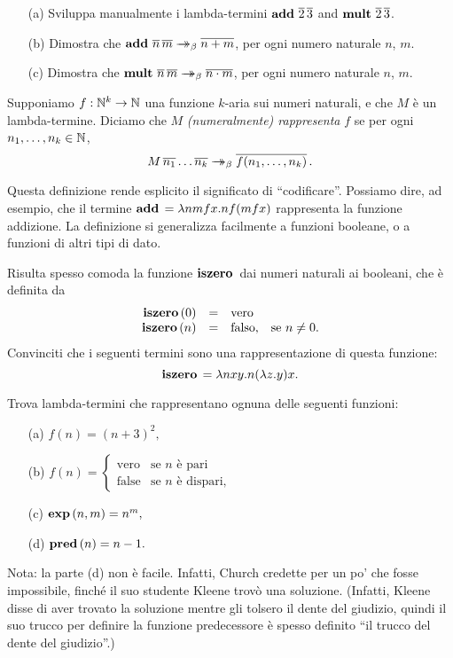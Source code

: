 \documentclass{article}
\begin{document}
\begin{exercise}
  \begin{enumerate}
  \item[(a)] Sviluppa manualmente i lambda-termini
    $\mathop{\textbf{\bf add}\,}\mathop{\overline{2}}\mathop{\overline{3}}$ and $\mathop{\textbf{\bf mult}\,}\mathop{\overline{2}}\mathop{\overline{3}}$.
  \item[(b)] Dimostra che $\mathop{\textbf{\bf add}\,}\mathop{\overline{n}}\mathop{\overline{m}}\mathrel{\rightarrow\!\!\!\!\!\rightarrow}_{\beta}\mathop{\overline{n+m}}$,
    per ogni numero naturale $n$, $m$.
  \item[(c)] Dimostra che
    $\mathop{\textbf{\bf mult}\,}\mathop{\overline{n}}\mathop{\overline{m}}\mathrel{\rightarrow\!\!\!\!\!\rightarrow}_{\beta}\mathop{\overline{n\cdot m}}$, per ogni numero
    naturale $n$, $m$.
  \end{enumerate}
\end{exercise}

\begin{definition}
  Supponiamo $f:\mathbb{N}^k\to \mathbb{N}$ una funzione $k$-aria sui numeri naturali,
  e che $M$ \`e un lambda-termine. Diciamo che $M$ {\em (numeralmente)
    rappresenta} $f$ se per ogni $n_1,\ldots,n_k\in\mathbb{N}$,
  \[ M\mathop{\overline{n_1}}\ldots\mathop{\overline{n_k}} \mathrel{\rightarrow\!\!\!\!\!\rightarrow}_{\beta} \mathop{\overline{f(n_1,\ldots,n_k)}}.
  \]
\end{definition}

Questa definizione rende esplicito il significato di ``codificare''.
Possiamo dire, ad esempio, che il termine $\mathop{\textbf{\bf add}\,} = \lambda nmfx.nf(mfx)$
rappresenta la funzione addizione. La definizione si generalizza facilmente
a funzioni booleane, o a funzioni di altri tipi di dato.

Risulta spesso comoda la funzione $\mathop{\textbf{\bf iszero}\,}$ dai numeri naturali ai booleani,
che \`e definita da
\[ \begin{array}{rcll}
  \mathop{\textbf{\bf iszero}\,}(0) &=& \mbox{vero} \\
  \mathop{\textbf{\bf iszero}\,}(n) &=& \mbox{falso,} & \mbox{se $n\neq 0$.}
\end{array}
\]
Convinciti che i seguenti termini sono una rappresentazione
di questa funzione:
\[ \mathop{\textbf{\bf iszero}\,} = \lambda nxy.n(\lambda z.y)x. \]

\begin{exercise}
  Trova lambda-termini che rappresentano ognuna delle seguenti funzioni:
  \begin{enumerate}
  \item[(a)] 
    $ f(n)=(n+3)^2, $
  \item[(b)] 
    $  f(n)=\left\{\begin{array}{ll}\mbox{vero}&\mbox{se
          $n$ \`e pari}\\\mbox{false}&\mbox{se $n$ \`e dispari,}
      \end{array}\right. 
    $
  \item[(c)] 
    $ \mathop{\textbf{\bf exp}\,}(n,m)=n^m, $
  \item[(d)] 
    $ \mathop{\textbf{\bf pred}\,}(n)=n-1. $
  \end{enumerate}
  Nota: la parte (d) non \`e facile. Infatti, Church credette per
  un po' che fosse impossibile, finch\'e il suo studente Kleene trov\`o una soluzione.
  (Infatti, Kleene disse di aver trovato la soluzione mentre gli tolsero
  il dente del giudizio, quindi il suo trucco per definire la funzione predecessore
  \`e spesso definito ``il trucco del dente del giudizio''.)
\end{exercise}
\end{document}
